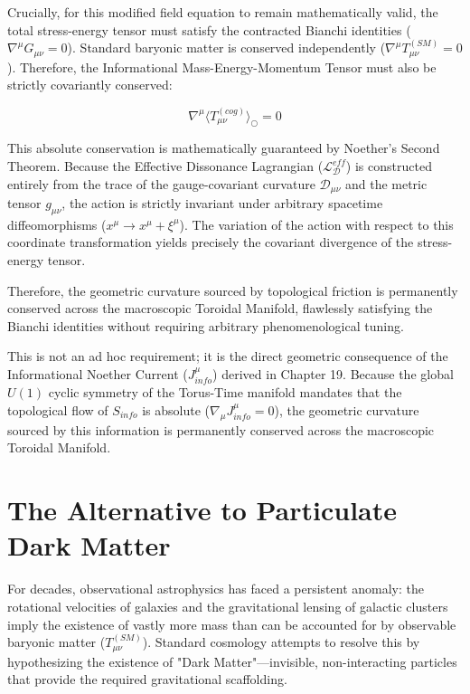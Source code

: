 \documentclass[12pt,openany]{book}
\theoremstyle{plain}
\theoremstyle{definition}
\theoremstyle{remark}
\begin{document}
Crucially, for this modified field equation to remain mathematically valid, the total stress-energy tensor must satisfy the contracted Bianchi identities ($\nabla^\mu G_{\mu\nu} = 0$). Standard baryonic matter is conserved independently ($\nabla^\mu T_{\mu\nu}^{(SM)} = 0$). Therefore, the Informational Mass-Energy-Momentum Tensor must also be strictly covariantly conserved:

\begin{equation}
\nabla^\mu \langle T_{\mu\nu}^{(cog)} \rangle_{\bigcirc} = 0
\end{equation}

This absolute conservation is mathematically guaranteed by Noether's Second Theorem. Because the Effective Dissonance Lagrangian ($\mathcal{L}_{\mathcal{D}}^{eff}$) is constructed entirely from the trace of the gauge-covariant curvature $\mathcal{D}_{\mu\nu}$ and the metric tensor $g_{\mu\nu}$, the action is strictly invariant under arbitrary spacetime diffeomorphisms ($x^\mu \to x^\mu + \xi^\mu$). The variation of the action with respect to this coordinate transformation yields precisely the covariant divergence of the stress-energy tensor. 

Therefore, the geometric curvature sourced by topological friction is permanently conserved across the macroscopic Toroidal Manifold, flawlessly satisfying the Bianchi identities without requiring arbitrary phenomenological tuning.

This is not an ad hoc requirement; it is the direct geometric consequence of the Informational Noether Current ($J_{info}^\mu$) derived in Chapter 19. Because the global $U(1)$ cyclic symmetry of the Torus-Time manifold mandates that the topological flow of $S_{info}$ is absolute ($\nabla_\mu J_{info}^\mu = 0$), the geometric curvature sourced by this information is permanently conserved across the macroscopic Toroidal Manifold.

\section{The Alternative to Particulate Dark Matter}

For decades, observational astrophysics has faced a persistent anomaly: the rotational velocities of galaxies and the gravitational lensing of galactic clusters imply the existence of vastly more mass than can be accounted for by observable baryonic matter ($T_{\mu\nu}^{(SM)}$). Standard cosmology attempts to resolve this by hypothesizing the existence of "Dark Matter"—invisible, non-interacting particles that provide the required gravitational scaffolding.
\end{document}

